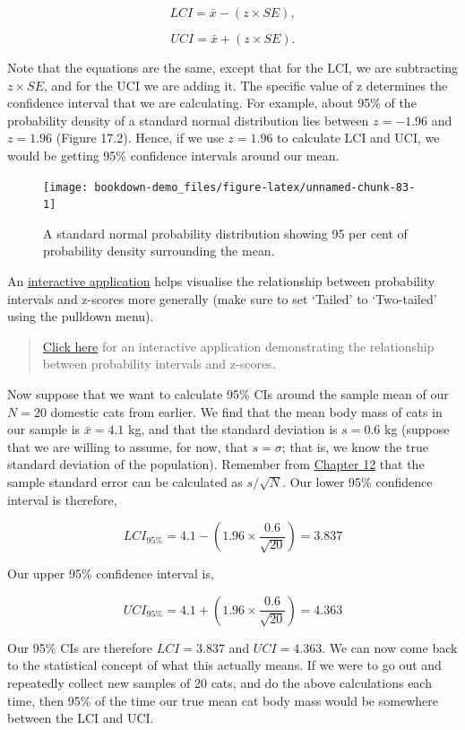\documentclass[
]{scrbook}
\begin{document}
\[LCI = \bar{x} - (z \times SE),\]

\[UCI = \bar{x} + (z \times SE).\]

Note that the equations are the same, except that for the LCI, we are subtracting \(z \times SE\), and for the UCI we are adding it.
The specific value of z determines the confidence interval that we are calculating.
For example, about 95\% of the probability density of a standard normal distribution lies between \(z = -1.96\) and \(z = 1.96\) (Figure 17.2).
Hence, if we use \(z = 1.96\) to calculate LCI and UCI, we would be getting 95\% confidence intervals around our mean.

\begin{figure}
\texttt{[image: bookdown-demo\_files/figure-latex/unnamed-chunk-83-1]} \caption{A standard normal probability distribution showing 95 per cent of probability density surrounding the mean.}\label{fig:unnamed-chunk-83}
\end{figure}

An \href{https://bradduthie.shinyapps.io/zandp/}{interactive application} helps visualise the relationship between probability intervals and z-scores more generally (make sure to set `Tailed' to `Two-tailed' using the pulldown menu).

\begin{quote}
\href{https://bradduthie.shinyapps.io/zandp/}{Click here} for an interactive application demonstrating the relationship between probability intervals and z-scores.
\end{quote}

Now suppose that we want to calculate 95\% CIs around the sample mean of our \(N = 20\) domestic cats from earlier.
We find that the mean body mass of cats in our sample is \(\bar{x} = 4.1\) kg, and that the standard deviation is \(s = 0.6\) kg (suppose that we are willing to assume, for now, that \(s = \sigma\); that is, we know the true standard deviation of the population).
Remember from \protect\hyperlink{Chapter_12}{Chapter 12} that the sample standard error can be calculated as \(s / \sqrt{N}\).
Our lower 95\% confidence interval is therefore,

\[LCI_{95\%} = 4.1 - \left(1.96 \times \frac{0.6}{\sqrt{20}}\right) = 3.837\]

Our upper 95\% confidence interval is,

\[UCI_{95\%} = 4.1 + \left(1.96 \times \frac{0.6}{\sqrt{20}}\right) = 4.363\]

Our 95\% CIs are therefore \(LCI = 3.837\) and \(UCI = 4.363\).
We can now come back to the statistical concept of what this actually means.
If we were to go out and repeatedly collect new samples of 20 cats, and do the above calculations each time, then 95\% of the time our true mean cat body mass would be somewhere between the LCI and UCI.
\end{document}
